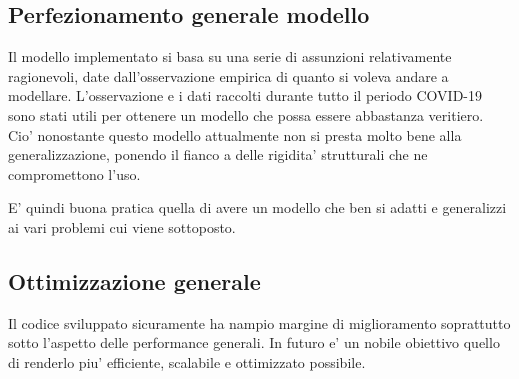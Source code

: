 \subsection{Perfezionamento generale modello}
Il modello implementato si basa su una serie di assunzioni relativamente ragionevoli, date dall'osservazione empirica
di quanto si voleva andare a modellare. L'osservazione e i dati raccolti durante tutto il periodo COVID-19 sono stati 
utili per ottenere un modello che possa essere abbastanza veritiero. Cio' nonostante questo modello attualmente non si presta
molto bene alla generalizzazione, ponendo il fianco a delle rigidita' strutturali che ne compromettono l'uso. 

E' quindi buona pratica quella di avere un modello che ben si adatti e generalizzi ai vari problemi cui viene sottoposto.

\subsection{Ottimizzazione generale}
Il codice sviluppato sicuramente ha nampio margine di miglioramento soprattutto sotto l'aspetto delle performance generali. 
In futuro e' un nobile obiettivo quello di renderlo piu' efficiente, scalabile e ottimizzato possibile.

